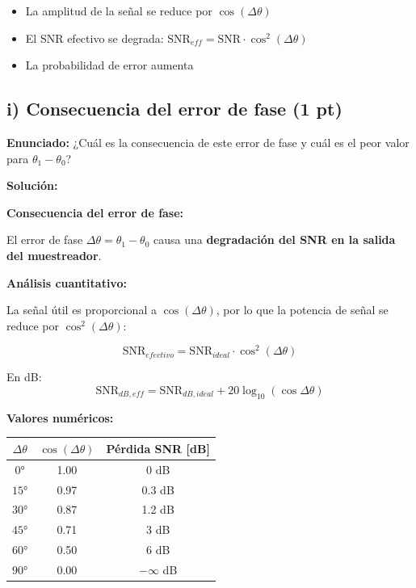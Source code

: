\documentclass[11pt,a4paper]{article}
\begin{document}
\begin{itemize}
    \item La amplitud de la se\~nal se reduce por $\cos(\Delta\theta)$
    \item El SNR efectivo se degrada: $\text{SNR}_{eff} = \text{SNR} \cdot \cos^2(\Delta\theta)$
    \item La probabilidad de error aumenta
\end{itemize}



\subsection*{i) Consecuencia del error de fase (1 pt)}

\textbf{Enunciado:} ¿Cu\'al es la consecuencia de este error de fase y cu\'al es el peor valor para $\theta_1 - \theta_0$?

\vspace{0.3cm}
\textbf{Soluci\'on:}

\textbf{Consecuencia del error de fase:}

El error de fase $\Delta\theta = \theta_1 - \theta_0$ causa una \textbf{degradaci\'on del SNR en la salida del muestreador}.

\textbf{An\'alisis cuantitativo:}

La se\~nal \'util es proporcional a $\cos(\Delta\theta)$, por lo que la potencia de se\~nal se reduce por $\cos^2(\Delta\theta)$:

\[
\text{SNR}_{efectivo} = \text{SNR}_{ideal} \cdot \cos^2(\Delta\theta)
\]

En dB:
\[
\text{SNR}_{dB,eff} = \text{SNR}_{dB,ideal} + 20\log_{10}(\cos\Delta\theta)
\]

\textbf{Valores num\'ericos:}

\begin{center}
\begin{tabular}{|c|c|c|}
\hline
\textbf{$\Delta\theta$} & \textbf{$\cos(\Delta\theta)$} & \textbf{P\'erdida SNR [dB]} \\
\hline
$0°$ & 1.00 & 0 dB \\
$15°$ & 0.97 & 0.3 dB \\
$30°$ & 0.87 & 1.2 dB \\
$45°$ & 0.71 & 3 dB \\
$60°$ & 0.50 & 6 dB \\
$90°$ & 0.00 & $-\infty$ dB \\
\hline
\end{tabular}
\end{center}
\end{document}
